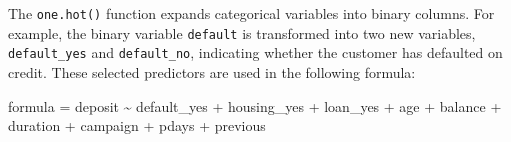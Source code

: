 \documentclass[
  11pt,
]{book}
\makeatletter
\newenvironment{Shaded}{}{}
\newcommand{\DecValTok}[1]{#1}
\newcommand{\NormalTok}[1]{#1}
\newcommand{\OtherTok}[1]{\textcolor[rgb]{0.39,0.39,0.39}{#1}}
\newcommand{\SpecialCharTok}[1]{\textcolor[rgb]{0.39,0.39,0.39}{#1}}
\newcommand{\StringTok}[1]{\textcolor[rgb]{0.39,0.39,0.39}{#1}}
\newenvironment{kframe}{%
\medskip{}
\setlength{\fboxsep}{.8em}
 \def\at@end@of@kframe{}%
 \ifinner\ifhmode%
  \def\at@end@of@kframe{\end{minipage}}%
  \begin{minipage}{\columnwidth}%
 \fi\fi%
 \def\FrameCommand##1{\hskip\@totalleftmargin \hskip-\fboxsep
 \colorbox{shadecolor}{##1}\hskip-\fboxsep
     \hskip-\linewidth \hskip-\@totalleftmargin \hskip\columnwidth}%
 \MakeFramed {\advance\hsize-\width
   \@totalleftmargin\z@ \linewidth\hsize
   \@setminipage}}%
 {\par\unskip\endMakeFramed%
 \at@end@of@kframe}
\renewenvironment{Shaded}{\begin{kframe}}{\end{kframe}}
\theoremstyle{definition}
\theoremstyle{definition}
\theoremstyle{definition}
\theoremstyle{definition}
\theoremstyle{remark}
\makeatother
\begin{document}
\begin{Shaded}
\end{Shaded}

The \texttt{one.hot()} function expands categorical variables into binary columns. For example, the binary variable \texttt{default} is transformed into two new variables, \texttt{default\_yes} and \texttt{default\_no}, indicating whether the customer has defaulted on credit. These selected predictors are used in the following formula:

\begin{Shaded}
\begin{Highlighting}[]
\NormalTok{formula }\OtherTok{=}\NormalTok{ deposit }\SpecialCharTok{\textasciitilde{}}\NormalTok{ default\_yes }\SpecialCharTok{+}\NormalTok{ housing\_yes }\SpecialCharTok{+}\NormalTok{ loan\_yes }\SpecialCharTok{+}\NormalTok{ age }\SpecialCharTok{+}\NormalTok{ balance }\SpecialCharTok{+}\NormalTok{ duration }\SpecialCharTok{+}\NormalTok{ campaign }\SpecialCharTok{+}\NormalTok{ pdays }\SpecialCharTok{+}\NormalTok{ previous}
\end{Highlighting}
\end{Shaded}
\end{document}
